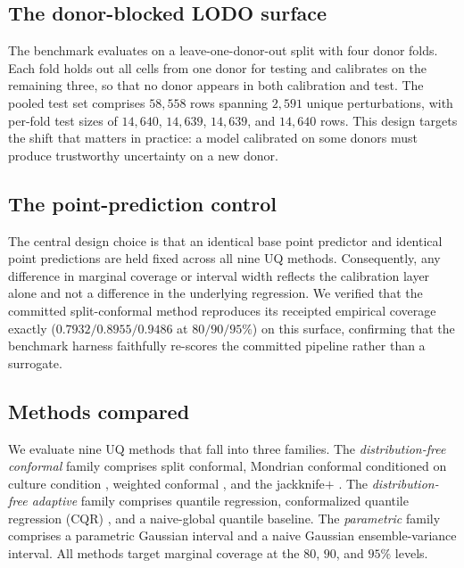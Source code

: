 \documentclass{article}
\begin{document}
\subsection{The donor-blocked LODO surface}

The benchmark evaluates on a leave-one-donor-out split with four donor
folds. Each fold holds out all cells from one donor for testing and
calibrates on the remaining three, so that no donor appears in both
calibration and test. The pooled test set comprises $58{,}558$ rows
spanning $2{,}591$ unique perturbations, with per-fold test sizes of
$14{,}640$, $14{,}639$, $14{,}639$, and $14{,}640$ rows. This design
targets the shift that matters in practice: a model calibrated on some
donors must produce trustworthy uncertainty on a new donor.

\subsection{The point-prediction control}

The central design choice is that an identical base point predictor and
identical point predictions are held fixed across all nine UQ methods.
Consequently, any difference in marginal coverage or interval width
reflects the calibration layer alone and not a difference in the
underlying regression. We verified that the committed split-conformal
method reproduces its receipted empirical coverage exactly
($0.7932/0.8955/0.9486$ at $80/90/95\%$) on this surface, confirming that
the benchmark harness faithfully re-scores the committed pipeline rather
than a surrogate.

\subsection{Methods compared}

We evaluate nine UQ methods that fall into three families. The
\emph{distribution-free conformal} family comprises split conformal,
Mondrian conformal conditioned on culture condition
\citep{vovk2005algorithmic}, weighted conformal
\citep{tibshirani2019conformal}, and the jackknife$+$
\citep{barber2021jackknife}. The \emph{distribution-free adaptive} family
comprises quantile regression, conformalized quantile regression (CQR)
\citep{romano2019conformalized}, and a naive-global quantile baseline.
The \emph{parametric} family comprises a parametric Gaussian interval and
a naive Gaussian ensemble-variance interval. All methods target marginal
coverage at the $80$, $90$, and $95\%$ levels.
\end{document}

